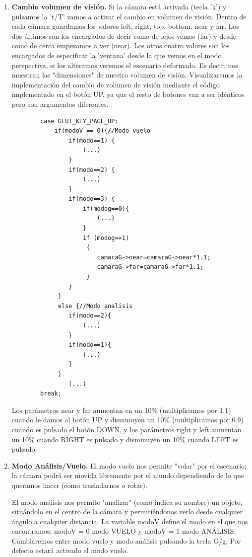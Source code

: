 \documentclass[12pt,a4paper]{article}
\begin{document}
\begin{enumerate}
\begin{enumerate}
\begin{enumerate}
\item \textbf{Cambio volumen de visión.}
Si la cámara está activada (tecla 'k') y pulsamos la 't/T' vamos a activar el cambio en volumen de visión.\newline
Dentro de cada cámara guardamos los valores left, right, top, bottom, near y far. Los dos últimos son los encargados de decir como de lejos vemos (far) y desde como de cerca empezamos a ver (near). Los otros cuatro valores son los encargados de especificar la 'ventana' desde la que vemos en el modo perspectiva, si los alteramos veremos el escenario deformado. Es decir, nos muestran las "dimensiones" de nuestro volumen de visión.\newline
Visualizaremos la implementación del cambio de volumen de visión mediante el código implementado en el botón UP, ya que el resto de botones van a ser idénticos pero con argumentos diferentes.
\begin{lstlisting}
        case GLUT_KEY_PAGE_UP:
        	if(modoV == 0){//Modo vuelo
                if(modo==1) {
					(...)
                }
                if(modo==2) {
   					(...)
                }
               	if(modo==3) {
               		if(modog==0){
						(...)
                    }
                    if (modog==1)
                     {
                		camaraG->near=camaraG->near*1.1;
                		camaraG->far=camaraG->far*1.1;
                     } 
                }
             }
             else {//Modo analisis
             	if(modo==2){
             		(...)
             	}
             	if(modo==1){
             		(...)
             	}
             }
                (...)
        break;
\end{lstlisting}

Los parámetros near y far aumentan en un 10\% (multiplicamos por 1.1) cuando le damos al botón UP y disminuyen un 10\% (multiplicamos por 0.9) cuando es pulsado el botón DOWN, y los parámetros right y left aumentan un 10\% cuando RIGHT es pulsado y disminuyen un 10\% cuando LEFT es pulsado. 

\item \textbf{Modo Análisis/Vuelo.}
El modo vuelo nos permite "volar" por el escenario; la cámara podrá ser movida libremente por el mundo dependiendo de lo que queramos hacer (como trasladarnos o rotar).

El modo análisis nos permite "analizar" (como indica su nombre) un objeto, situándolo en el centro de la cámara y permitiéndonos verlo desde cualquier ángulo a cualquier distancia.
La variable modoV define el modo en el que nos encontramos; modoV = 0 modo VUELO y modoV = 1 modo ANÁLISIS.
Cambiaremos entre modo vuelo y modo análisis pulsando la tecla G/g. Por defecto estará activado el modo vuelo.



\end{enumerate}
\end{enumerate}
\end{enumerate}
\end{document}
